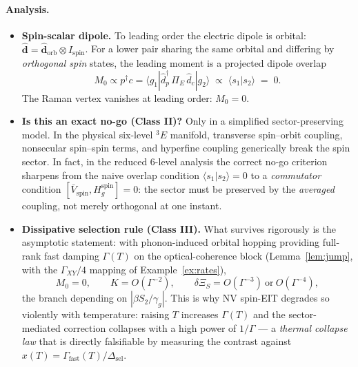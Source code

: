 \documentclass[11pt,a4paper]{article}
\theoremstyle{remark}
\newcommand{\ket}[1]{|#1\rangle}
\newcommand{\bra}[1]{\langle #1|}
\newcommand{\braket}[2]{\langle #1|#2\rangle}
\begin{document}
\paragraph{Analysis.}
\begin{itemize}
\item \textbf{Spin-scalar dipole.} To leading order the electric dipole is
      orbital: $\hat{\bm d}=\hat{\bm d}_{\mathrm{orb}}\otimes I_{\mathrm{spin}}$.
      For a lower pair sharing the same orbital and differing by
      \emph{orthogonal spin} states, the leading moment is a projected dipole
      overlap
      \[
      M_0\propto p^\dagger c
      =\bra{g_1}\hat d_p^\dagger\,\Pi_E\,\hat d_c\ket{g_2}
      \;\propto\;\braket{s_1}{s_2}\;=\;0 .
      \]
      The Raman vertex vanishes at leading order: $M_0=0$.
\item \textbf{Is this an exact no-go (Class II)?} Only in a simplified
      sector-preserving model. In the physical six-level $^3E$ manifold,
      transverse spin--orbit coupling, nonsecular spin--spin terms, and
      hyperfine coupling generically break the spin sector. In fact, in the
      reduced 6-level analysis the correct no-go criterion sharpens from the
      naive overlap condition $\braket{s_1}{s_2}=0$ to a \emph{commutator}
      condition $[\bar V_{\mathrm{spin}},H_g^{\mathrm{spin}}]=0$: the sector
      must be preserved by the \emph{averaged} coupling, not merely orthogonal
      at one instant.
\item \textbf{Dissipative selection rule (Class III).} What survives
      rigorously is the asymptotic statement: with phonon-induced orbital
      hopping providing full-rank fast damping $\Gamma(T)$ on the
      optical-coherence block (Lemma~\ref{lem:jump}, with the
      $\Gamma_{XY}/4$ mapping of Example~\ref{ex:rates}),
      \[
      M_0=0,\qquad K=O(\Gamma^{-2}),\qquad
      \delta\Xi_S=O(\Gamma^{-3})\ \text{or}\ O(\Gamma^{-4}),
      \]
      the branch depending on $|\beta S_2/\gamma_g|$. This is why NV spin-EIT
      degrades so violently with temperature: raising $T$ increases
      $\Gamma(T)$ and the sector-mediated correction collapses with a high
      power of $1/\Gamma$ --- a \emph{thermal collapse law} that is directly
      falsifiable by measuring the contrast against
      $x(T)=\Gamma_{\mathrm{fast}}(T)/\Delta_{\mathrm{sel}}$.
\end{itemize}
\end{document}
